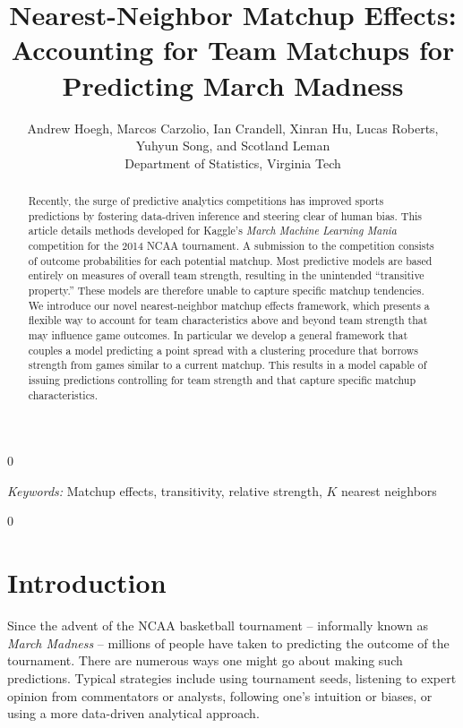 \documentclass[letterpaper,12pt]{article}
\newcommand{\blind}{0}
\begin{document}
\blind
{
\title{Nearest-Neighbor Matchup Effects:  Accounting for Team Matchups for Predicting March Madness}
 \author{Andrew Hoegh, Marcos Carzolio, Ian Crandell, Xinran Hu, Lucas Roberts, \\Yuhyun Song, and Scotland Leman\\
 Department of Statistics, Virginia Tech}        
  \originalmaketitle
  \begin{abstract} 
\noindent
Recently, the surge of predictive analytics competitions has improved sports predictions by fostering data-driven inference and steering clear of human bias. This article details methods developed for Kaggle's \emph{March Machine Learning Mania} competition for the 2014 NCAA tournament. A submission to the competition consists of outcome probabilities for each potential matchup. Most predictive models are based entirely on measures of overall team strength, resulting in the unintended ``transitive property.'' These models are therefore unable to capture specific matchup tendencies. We introduce our novel nearest-neighbor matchup effects framework, which presents a flexible way to account for team characteristics above and beyond team strength that may influence game outcomes. In particular we develop a general framework that couples a model predicting a point spread with a clustering procedure that borrows strength from games similar to a current matchup. This results in a model capable of issuing predictions controlling for team strength and that capture specific matchup characteristics.
\end{abstract}

\noindent%
{\it Keywords:}  Matchup effects, transitivity, relative strength, $K$ nearest neighbors
} \fi

\blind
{
} \fi

\newpage




\section{Introduction}
Since the advent of the NCAA basketball tournament -- informally known as \emph{March Madness} -- millions of people have taken to predicting the outcome of the tournament. There are numerous ways one might go about making such predictions. Typical strategies include using tournament seeds, listening to expert opinion from commentators or analysts, following one's intuition or biases, or using a more data-driven analytical approach. 
\end{document}
